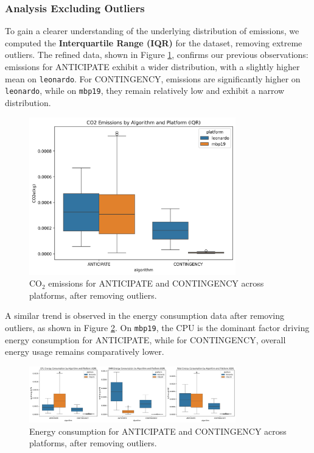 \documentclass[a4paper,singleside,12pt]{report} %
\begin{document}
\subsubsection{Analysis Excluding Outliers}

To gain a clearer understanding of the underlying distribution of emissions, we computed the \textbf{Interquartile Range (IQR)} for the dataset, removing extreme outliers. The refined data, 
shown in Figure \ref{fig:ant_cont_emissions_iqr}, confirms our previous observations: emissions for ANTICIPATE exhibit a wider distribution, with a slightly higher mean on \verb|leonardo|. 
For CONTINGENCY, emissions are significantly higher on \verb|leonardo|, while on \verb|mbp19|, they remain relatively low and exhibit a narrow distribution.

\begin{figure}[h!]
    \centering
    \includegraphics[width=0.8\textwidth]{imgs/CO2_emissions_no_outliers.png}
    \caption{CO$_2$ emissions for ANTICIPATE and CONTINGENCY across platforms, after removing outliers.}
    \label{fig:ant_cont_emissions_iqr}
\end{figure}

A similar trend is observed in the energy consumption data after removing outliers, as shown in Figure \ref{fig:ant_cont_energy_iqr}. On \verb|mbp19|, the CPU is the dominant factor driving 
energy consumption for ANTICIPATE, while for CONTINGENCY, overall energy usage remains comparatively lower.

\begin{figure}[h!]
    \centering
    \includegraphics[width=0.8\textwidth]{imgs/energy_consumption_no_outliers.png}
    \caption{Energy consumption for ANTICIPATE and CONTINGENCY across platforms, after removing outliers.}
    \label{fig:ant_cont_energy_iqr}
\end{figure}
\end{document}
